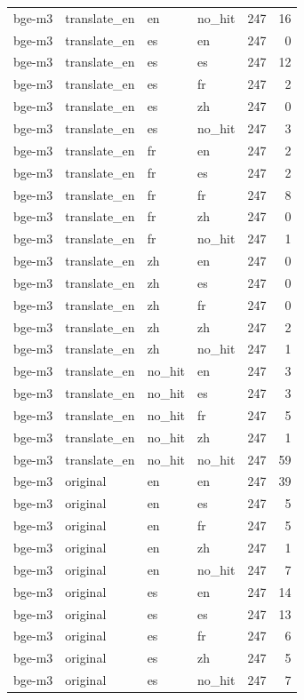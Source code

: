 \begin{tabular}{llllrr}
bge-m3 & translate\_en & en & no\_hit & 247 & 16 \\
bge-m3 & translate\_en & es & en & 247 & 0 \\
bge-m3 & translate\_en & es & es & 247 & 12 \\
bge-m3 & translate\_en & es & fr & 247 & 2 \\
bge-m3 & translate\_en & es & zh & 247 & 0 \\
bge-m3 & translate\_en & es & no\_hit & 247 & 3 \\
bge-m3 & translate\_en & fr & en & 247 & 2 \\
bge-m3 & translate\_en & fr & es & 247 & 2 \\
bge-m3 & translate\_en & fr & fr & 247 & 8 \\
bge-m3 & translate\_en & fr & zh & 247 & 0 \\
bge-m3 & translate\_en & fr & no\_hit & 247 & 1 \\
bge-m3 & translate\_en & zh & en & 247 & 0 \\
bge-m3 & translate\_en & zh & es & 247 & 0 \\
bge-m3 & translate\_en & zh & fr & 247 & 0 \\
bge-m3 & translate\_en & zh & zh & 247 & 2 \\
bge-m3 & translate\_en & zh & no\_hit & 247 & 1 \\
bge-m3 & translate\_en & no\_hit & en & 247 & 3 \\
bge-m3 & translate\_en & no\_hit & es & 247 & 3 \\
bge-m3 & translate\_en & no\_hit & fr & 247 & 5 \\
bge-m3 & translate\_en & no\_hit & zh & 247 & 1 \\
bge-m3 & translate\_en & no\_hit & no\_hit & 247 & 59 \\
bge-m3 & original & en & en & 247 & 39 \\
bge-m3 & original & en & es & 247 & 5 \\
bge-m3 & original & en & fr & 247 & 5 \\
bge-m3 & original & en & zh & 247 & 1 \\
bge-m3 & original & en & no\_hit & 247 & 7 \\
bge-m3 & original & es & en & 247 & 14 \\
bge-m3 & original & es & es & 247 & 13 \\
bge-m3 & original & es & fr & 247 & 6 \\
bge-m3 & original & es & zh & 247 & 5 \\
bge-m3 & original & es & no\_hit & 247 & 7 \\

\end{tabular}

